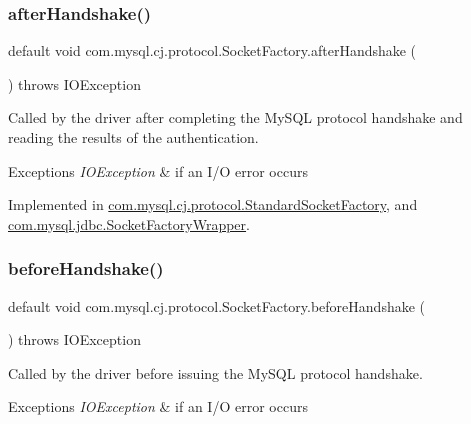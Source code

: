 \subsubsection{\texorpdfstring{after\+Handshake()}{afterHandshake()}}
{\footnotesize\ttfamily default void com.\+mysql.\+cj.\+protocol.\+Socket\+Factory.\+after\+Handshake (\begin{DoxyParamCaption}{ }\end{DoxyParamCaption}) throws I\+O\+Exception}

Called by the driver after completing the My\+S\+QL protocol handshake and reading the results of the authentication.


\begin{DoxyExceptions}{Exceptions}
{\em I\+O\+Exception} & if an I/O error occurs \\
\hline
\end{DoxyExceptions}


Implemented in \mbox{\hyperlink{classcom_1_1mysql_1_1cj_1_1protocol_1_1_standard_socket_factory_a3d55f3b14d5d46d75ab93c88a339a72a}{com.\+mysql.\+cj.\+protocol.\+Standard\+Socket\+Factory}}, and \mbox{\hyperlink{classcom_1_1mysql_1_1jdbc_1_1_socket_factory_wrapper_ab7dde0fd740255950d83759b418fd2ff}{com.\+mysql.\+jdbc.\+Socket\+Factory\+Wrapper}}.

\mbox{\label{interfacecom_1_1mysql_1_1cj_1_1protocol_1_1_socket_factory_afc456b268ae05cf284598c3acc33829f}} 
\subsubsection{\texorpdfstring{before\+Handshake()}{beforeHandshake()}}
{\footnotesize\ttfamily default void com.\+mysql.\+cj.\+protocol.\+Socket\+Factory.\+before\+Handshake (\begin{DoxyParamCaption}{ }\end{DoxyParamCaption}) throws I\+O\+Exception}

Called by the driver before issuing the My\+S\+QL protocol handshake.


\begin{DoxyExceptions}{Exceptions}
{\em I\+O\+Exception} & if an I/O error occurs \\
\hline
\end{DoxyExceptions}


